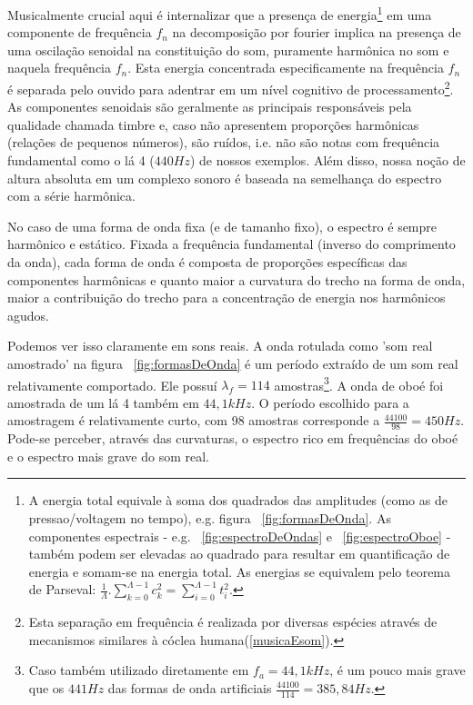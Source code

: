 Musicalmente crucial aqui é internalizar que a presença de
energia\footnote{A energia total equivale à soma dos quadrados das amplitudes
(como as de pressao/voltagem no tempo), e.g. figura ~\ref{fig:formasDeOnda}.
As componentes espectrais - e.g. ~\ref{fig:espectroDeOndas} e ~\ref{fig:espectroOboe} -
também podem ser elevadas ao quadrado para resultar em quantificação de energia e somam-se na energia total. As energias se equivalem pelo teorema de Parseval: $\frac{1}{\Lambda} . \sum_{k=0}^{\Lambda -1}c_k^2 = \sum_{i=0}^{\Lambda-1}t_i^2$.}
em uma componente de frequência $f_n$ na decomposição por fourier 
implica na presença de uma oscilação senoidal na constituição do som, puramente harmônica no som e naquela frequência $f_n$. Esta energia concentrada especificamente na frequência $f_n$ é separada
 pelo ouvido para adentrar em um nível cognitivo de processamento\footnote{Esta separação em frequência é realizada por diversas espécies através de mecanismos similares à cóclea humana(\ref{musicaEsom}).}.
  As componentes senoidais são geralmente as principais responsáveis pela qualidade chamada timbre e, caso não apresentem proporções harmônicas (relações de pequenos números), são ruídos, i.e. não são notas com frequência fundamental como o lá 4 ($440 Hz$) de nossos exemplos. Além disso, nossa noção de altura absoluta em um complexo sonoro é baseada na semelhança do espectro com a série harmônica.

No caso de uma forma de onda fixa (e de tamanho fixo), o espectro é sempre harmônico e estático. Fixada a frequência fundamental (inverso do comprimento da onda), cada forma de onda é composta de proporções específicas das componentes harmônicas e 
quanto maior a curvatura do trecho na forma de onda, maior a contribuição do trecho para a
concentração de energia nos harmônicos agudos.

Podemos ver isso claramente em sons reais. A onda rotulada como 'som real amostrado' na figura ~\ref{fig:formasDeOnda} é um período extraído de um som real relativamente comportado. Ele possuí $\lambda_f=114$ amostras\footnote{Caso também utilizado diretamente em $f_a=44,1kHz$, é um pouco mais grave que os $441 Hz$ das formas de onda artificiais $\frac{44100}{114}=385,84Hz$.}. A onda de oboé foi amostrada de um lá 4 também em $44,1kHz$.
O período escolhido para a amostragem é relativamente curto, com 98 amostras corresponde a $\frac{44100}{98}=450 Hz$. Pode-se perceber, através das curvaturas, o espectro rico em frequências do oboé e o espectro mais grave do som real.

